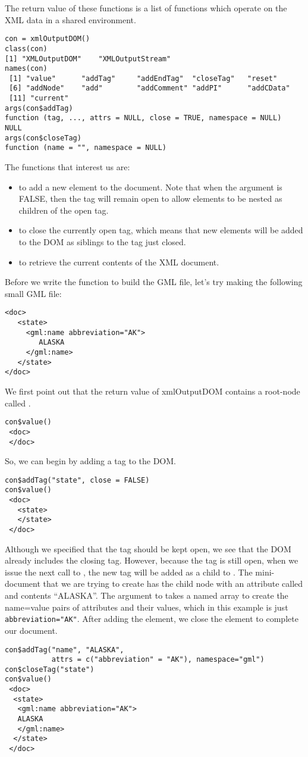 The return value of these functions is a list of 
functions which operate on the XML data in a shared environment.
\begin{verbatim}
con = xmlOutputDOM()
class(con)
[1] "XMLOutputDOM"    "XMLOutputStream"
names(con)
 [1] "value"      "addTag"     "addEndTag"  "closeTag"   "reset"
 [6] "addNode"    "add"        "addComment" "addPI"      "addCData"
 [11] "current"
args(con$addTag)
function (tag, ..., attrs = NULL, close = TRUE, namespace = NULL)
NULL
args(con$closeTag)
function (name = "", namespace = NULL)
\end{verbatim}

The functions that interest us are: 
\begin{itemize}
\item {} to add a new element to the document.
Note that when the argument  is FALSE, then the tag will remain
open to allow elements to be nested as children of the open tag.
\item {} to close the currently open tag, which means
that new elements will be added to the DOM as siblings to the tag just
closed. 
\item {} to retrieve the current contents of the XML document.
\end{itemize}

Before we write the function to build the GML file, 
let's try making the following small GML file: 
\begin{verbatim}
<doc>
   <state>
     <gml:name abbreviation="AK">
        ALASKA
     </gml:name>
   </state>
</doc>
\end{verbatim}
We first point out that the return value of xmlOutputDOM contains a root-node 
called . 
\begin{verbatim}
con$value()
 <doc>
 </doc>
\end{verbatim}
So, we can begin by adding a  tag to the DOM.
\begin{verbatim}
con$addTag("state", close = FALSE)
con$value()
 <doc>
   <state>
   </state>
 </doc>
\end{verbatim}
Although we specified that the tag should be kept open, 
we see that the DOM already includes the closing tag.
However, because the  tag is still open,
when we issue the next call to , 
the new tag will be added as a child to .
The mini-document that we are trying to create has
the child node  with an attribute called
 and contents ``ALASKA''.
The  argument to  takes a
named array to create the name=value pairs of attributes
and their values, which in this example is just 
\verb+abbreviation="AK"+.
After adding the  element, we close the  
element to complete our document.
\begin{verbatim}
con$addTag("name", "ALASKA", 
           attrs = c("abbreviation" = "AK"), namespace="gml")
con$closeTag("state")
con$value()
 <doc>
  <state>
   <gml:name abbreviation="AK">
   ALASKA
   </gml:name>
  </state>
 </doc>
\end{verbatim}

